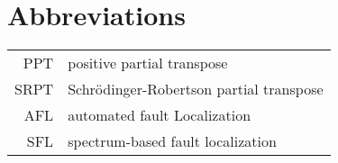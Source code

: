 \chapter*{Abbreviations} 

\begin{longtable}{rl}
PPT & positive partial transpose\\
SRPT & Schr\"odinger-Robertson partial transpose\\
AFL & automated fault Localization\\
SFL & spectrum-based fault localization
\end{longtable}